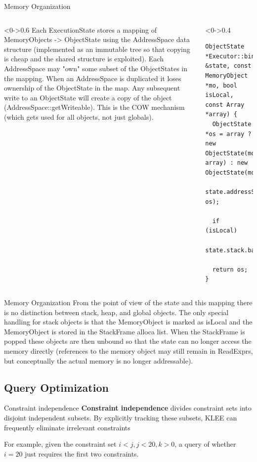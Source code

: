 \documentclass[9pt,aspectratio=43,mathserif,table]{beamer}
\begin{document}
\begin{frame}[fragile]{Memory Organization}
	\begin{columns}[T]
		\begin{column}<0->{0.6\textwidth}
			Each ExecutionState stores a mapping of MemoryObjects -> ObjectState using the AddressSpace data structure
			(implemented as an immutable tree so that copying is cheap and the shared structure is exploited).
			Each AddressSpace may "own" some subset of the ObjectStates in the mapping.
			When an AddressSpace is duplicated it loses ownership of the ObjectState in the map.
			Any subsequent write to an ObjectState will create a copy of the object (AddressSpace::getWriteable).
			This is the COW mechanism (which gets used for all objects, not just globals).
		\end{column}
		\hfill
		\begin{column}<0->{0.4\textwidth}
			\begin{lstlisting}
ObjectState *Executor::bindObjectInState(ExecutionState &state, const MemoryObject *mo, bool isLocal, const Array *array) {
  ObjectState *os = array ? new ObjectState(mo, array) : new ObjectState(mo);
  state.addressSpace.bindObject(mo, os);

  if (isLocal)
    state.stack.back().allocas.push_back(mo);

  return os;
}
      \end{lstlisting}
		\end{column}
	\end{columns}
\end{frame}
\begin{frame}{Memory Organization}
	From the point of view of the state and this mapping there is no distinction between stack, heap,
	and global objects. The only special handling for stack objects is that the MemoryObject is marked
	as isLocal and the MemoryObject is stored in the StackFrame alloca list. When the StackFrame is popped
	these objects are then unbound so that the state can no longer access the memory directly
	(references to the memory object may still remain in ReadExprs, but conceptually the actual memory is no longer addressable).
\end{frame}



\subsection{Query Optimization}

\begin{frame}{Constraint independence}
	\textbf{Constraint independence} divides constraint sets into disjoint independent subsets.
	By explicitly tracking these subsets, KLEE can frequently eliminate irrelevant constraints

	For example, given the constraint set ${i < j, j < 20, k > 0}$, a query of whether $i = 20$
	just requires the first two constraints.
\end{frame}
\end{document}
